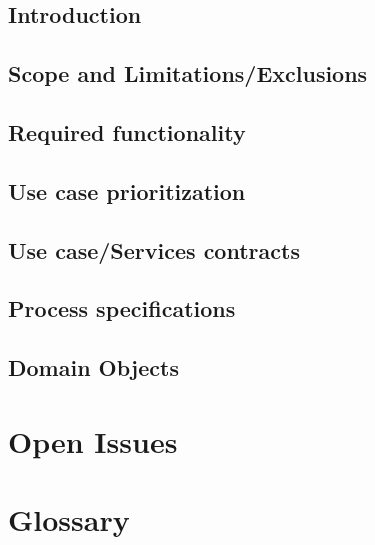 \documentclass[12pt]{article}
\begin{document}
  \subsection{Introduction}
  \subsection{Scope and Limitations/Exclusions}
  \subsection{Required functionality}
 \subsection{Use case prioritization}
 \subsection{Use case/Services contracts}
 \subsection{Process specifications}
 \subsection{Domain Objects}
 \section{Open Issues}
 \section{Glossary} 
\end{document}
